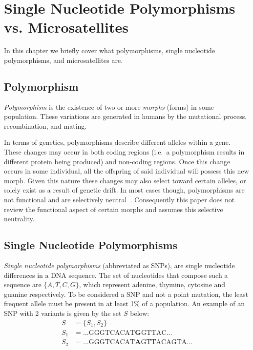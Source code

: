 \chapter{Single Nucleotide Polymorphisms vs. Microsatellites}\label{ch:SNPvsMicrosatellites}
In this chapter we briefly cover what polymorphisms, single nucleotide polymorphisms, and microsatellites are.

\section{Polymorphism}\label{sec:polymorphism}
\emph{Polymorphism} is the existence of two or more \emph{morphs} (forms) in some population.
These variations are generated in humans by the mutational process, recombination, and mating.

In terms of genetics, polymorphisms describe different alleles within a gene.
These changes may occur in both coding regions (i.e.\ a polymorphism results in different protein being produced) and
non-coding regions.
Once this change occurs in some individual, all the offspring of said individual will possess this new morph.
Given this nature these changes may also select toward certain alleles, or solely exist as a result of genetic drift.
In most cases though, polymorphisms are not functional and are selectively
neutral~\cite{wrightGeneticVariationPolymorphisms2005}.
Consequently this paper does not review the functional aspect of certain morphs and assumes this selective neutrality.

\section{Single Nucleotide Polymorphisms}\label{sec:singleNucleotidePolymorphism}
\emph{Single nucleotide polymorphisms} (abbreviated as SNPs), are single nucleotide differences in a DNA sequence.
The set of nucleotides that compose such a sequence are $\{ A, T, C, G \}$, which represent adenine, thymine,
cytosine and guanine respectively.
To be considered a SNP and not a point mutation, the least frequent allele must be present in at least 1\% of a
population.
An example of an SNP with 2 variants is given by the set $S$ below:
\begin{align*}
    S &= \{ S_1, S_2 \} \\
    S_1 &= \ldots \text{GGGTCACAT}\textbf{G}\text{GTTAC} \ldots \\
    S_2 &= \ldots \text{GGGTCACAT}\textbf{A}\text{GTTACAGTA} \ldots
\end{align*}

